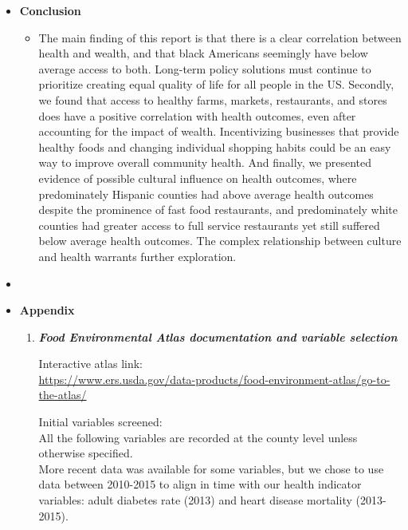 \documentclass{article}
\begin{document}
\begin{itemize}[leftmargin=0pt]
\item[] \textbf{Conclusion}
\begin{itemize}
    \item[] The main finding of this report is that there is a clear correlation between health and wealth, and that black Americans seemingly have below average access to both. Long-term policy solutions must continue to prioritize creating equal quality of life for all people in the US. Secondly, we found that access to healthy farms, markets, restaurants, and stores does have a positive correlation with health outcomes, even after accounting for the impact of wealth. Incentivizing businesses that provide healthy foods and changing individual shopping habits could be an easy way to improve overall community health. And finally, we presented evidence of possible cultural influence on health outcomes, where predominately Hispanic counties had above average health outcomes despite the prominence of fast food restaurants, and predominately white counties had greater access to full service restaurants yet still suffered below average health outcomes. The complex relationship between culture and health warrants further exploration.
\end{itemize}
 
\pagebreak

\item[] \label{ref:bib} \printbibliography

\pagebreak
\item[] \textbf{Appendix}
\begin{enumerate}
    \item \textbf{\textit{Food Environmental Atlas documentation and variable selection}}
        \label{ref:fea}
        
        Interactive atlas link:\\ \url{https://www.ers.usda.gov/data-products/food-environment-atlas/go-to-the-atlas/}

        Initial variables screened: \\All the following variables are recorded at the county level unless otherwise specified. \\More recent data was available for some variables, but we chose to use data between 2010-2015 to align in time with our health indicator variables: adult diabetes rate (2013) and heart disease mortality (2013-2015).


\end{enumerate}
\end{itemize}
\end{document}
